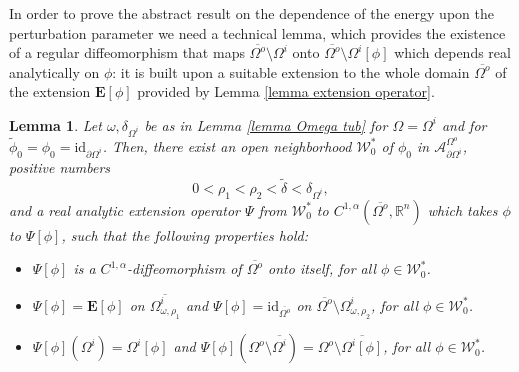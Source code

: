 \documentclass[11pt,reqno,a4paper]{amsart}
\theoremstyle{plain}
\newtheorem{lemma}[theorem]{Lemma}
\theoremstyle{definition}
\newcommand{\R}{\mathbb{R}}
\begin{document}
In order to prove the abstract result on the dependence of the energy upon the perturbation parameter we need a technical lemma, which provides the existence of a regular diffeomorphism that maps $\overline{\Omega^o}\setminus\Omega^i$ onto $\overline{\Omega^o} \setminus \Omega^i[\phi]$ which depends real analytically on $\phi$: it is built upon a suitable extension to the whole domain $\overline{\Omega^o}$ of the extension $\mathbf{E}[\phi]$ provided by Lemma \ref{lemma extension operator}.

\begin{lemma}\label{lemma diffeo}
    Let $\omega,\delta_{\Omega^i}$ be as in Lemma \ref{lemma Omega tub} for $\Omega = \Omega^i$ and for $\tilde{\phi}_0 = \phi_0 =\mathrm{id}_{\partial\Omega^i}$. Then, there exist an open neighborhood $\mathcal{W}^\ast_0$ of $\phi_0$ in $\mathcal{A}^{\Omega^o}_{\partial\Omega^i}$, positive numbers
    \[
    0<\rho_1<\rho_2<\tilde\delta<\delta_{\Omega^i},
    \]
    and a real analytic extension operator $\Psi$ from $\mathcal{W}^\ast_0$ to $C^{1,\alpha}(\overline{\Omega^o}, \R^n)$ which takes $\phi$ to $\Psi[\phi]$, such that the following properties hold:
    \begin{itemize}
        \item[(i)] $\Psi[\phi]$ is a $C^{1,\alpha}$-diffeomorphism of $\overline{\Omega^o}$ onto itself, for all $\phi \in \mathcal{W}^\ast_0$.
        \item[(ii)] $\Psi[\phi] = \mathbf{E}[\phi]$ on $\overline{\Omega^i_{\omega,\rho_1}}$ and $\Psi[\phi] = \mathrm{id}_{\overline{\Omega^o}}$ on $\overline{\Omega^o} \setminus \Omega^i_{\omega,\rho_2}$, for all $\phi \in \mathcal{W}^\ast_0$.
        \item[(iii)] $\Psi[\phi](\Omega^i) = \Omega^i[\phi]$ and $\Psi[\phi](\Omega^o\setminus\overline{\Omega^i}) = \Omega^o\setminus\overline{\Omega^i[\phi]}$, for all $\phi \in \mathcal{W}^\ast_0$.
    \end{itemize}
\end{lemma}
\end{document}
